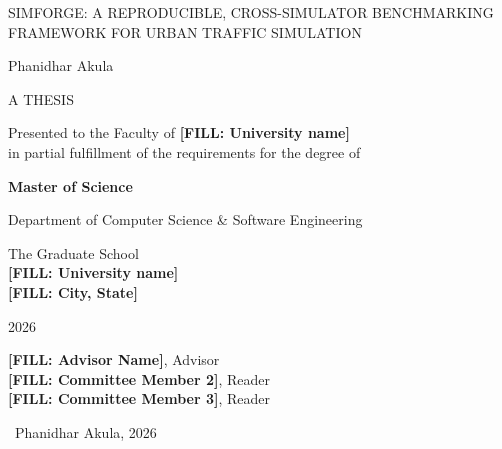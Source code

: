 \documentclass[12pt]{report}
\newcommand{\thesistitle}{SIMFORGE: A REPRODUCIBLE, CROSS-SIMULATOR BENCHMARKING FRAMEWORK FOR URBAN TRAFFIC SIMULATION}
\newcommand{\thesisauthor}{Phanidhar Akula}
\newcommand{\thesisdegree}{\textbf{Master of Science}}
\newcommand{\thesisdept}{Department of Computer Science \& Software Engineering}
\newcommand{\thesisschool}{The Graduate School\\\textbf{[FILL: University name]}\\\textbf{[FILL: City, State]}}
\newcommand{\thesisyear}{2026}
\newcommand{\advisor}{\textbf{[FILL: Advisor Name]}, Advisor}
\newcommand{\readerone}{\textbf{[FILL: Committee Member 2]}, Reader}
\newcommand{\readertwo}{\textbf{[FILL: Committee Member 3]}, Reader}
\begin{document}
\thispagestyle{empty}
\begin{center}
{\Large \thesistitle \par}
\vspace{24pt}
{\large \thesisauthor \par}
\vfill
{\large A THESIS\par}
\vspace{12pt}
Presented to the Faculty of \textbf{[FILL: University name]}\\
in partial fulfillment of the requirements for the degree of\\[4pt]
{\large \thesisdegree\par}
\vspace{12pt}
{\thesisdept\par}
{\thesisschool\par}
\vspace{12pt}
{\thesisyear\par}
\vfill
{\advisor\\\readerone\\\readertwo\par}
\vspace{36pt}
\textcopyright\ \thesisauthor, \thesisyear
\end{center}
\clearpage

\setcounter{page}{1}
\tableofcontents
\clearpage
\listoffigures
\clearpage
\listoftables
\clearpage









\cleardoublepage
{}
\setcounter{page}{1}











% 
% 
% 
% 
\end{document}
